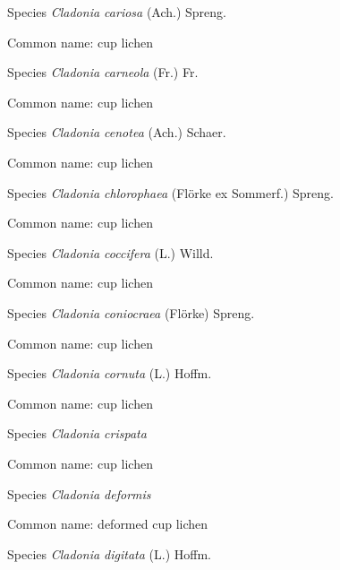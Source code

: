 \documentclass[9pt, article]{memoir}
\begin{document}
\begin{multicols}{2}
\vspace{6pt}\noindent\hspace{36pt}Species \textit{Cladonia cariosa} (Ach.) Spreng.


Common name: cup lichen

\vspace{6pt}\noindent\hspace{36pt}Species \textit{Cladonia carneola} (Fr.) Fr.


Common name: cup lichen

\vspace{6pt}\noindent\hspace{36pt}Species \textit{Cladonia cenotea} (Ach.) Schaer.


Common name: cup lichen

\vspace{6pt}\noindent\hspace{36pt}Species \textit{Cladonia chlorophaea} (Flörke ex Sommerf.) Spreng.


Common name: cup lichen

\vspace{6pt}\noindent\hspace{36pt}Species \textit{Cladonia coccifera} (L.) Willd.


Common name: cup lichen

\vspace{6pt}\noindent\hspace{36pt}Species \textit{Cladonia coniocraea} (Flörke) Spreng.


Common name: cup lichen

\vspace{6pt}\noindent\hspace{36pt}Species \textit{Cladonia cornuta} (L.) Hoffm.


Common name: cup lichen

\vspace{6pt}\noindent\hspace{36pt}Species \textit{Cladonia crispata}


Common name: cup lichen

\vspace{6pt}\noindent\hspace{36pt}Species \textit{Cladonia deformis}


Common name: deformed cup lichen

\vspace{6pt}\noindent\hspace{36pt}Species \textit{Cladonia digitata} (L.) Hoffm.



\end{multicols}
\end{document}

